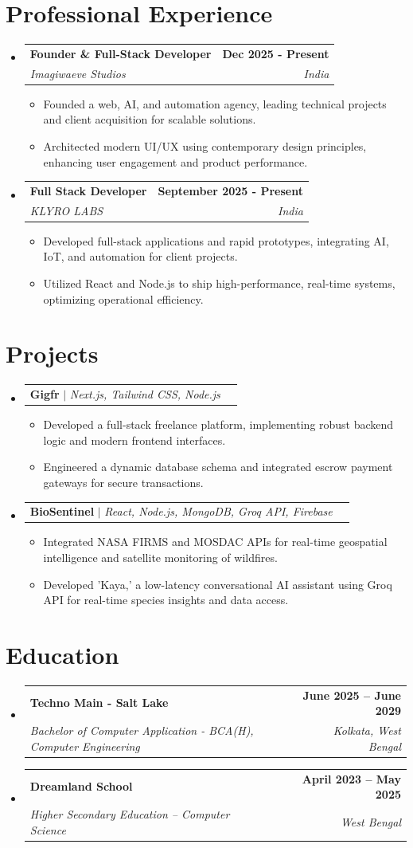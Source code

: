 \documentclass[letterpaper,11pt]{article}
\makeatletter
\newcommand{\resumeItem}[1]{\item\small{{#1 \vspace{-2pt}}}}
\newcommand{\resumeSubheading}[4]{\vspace{-2pt}\item\begin{tabular*}{1.0\textwidth}[t]{l@{\extracolsep{\fill}}r}\textbf{#1} & \textbf{\small #2} \\\textit{\small#3} & \textit{\small #4} \\\end{tabular*}\vspace{-7pt}}
\newcommand{\resumeProjectHeading}[2]{\item\begin{tabular*}{1.001\textwidth}{l@{\extracolsep{\fill}}r}\small#1 & \textbf{\small #2}\\\end{tabular*}\vspace{-7pt}}
\newcommand{\resumeSubHeadingListStart}{\begin{itemize}[leftmargin=0.0in, label={}]}
\newcommand{\resumeSubHeadingListEnd}{\end{itemize}}
\newcommand{\resumeItemListStart}{\begin{itemize}}
\newcommand{\resumeItemListEnd}{\end{itemize}\vspace{-5pt}}
\makeatother
\begin{document}
\section{Professional Experience}
  \resumeSubHeadingListStart
\resumeSubheading{Founder \& Full-Stack Developer}{Dec 2025 - Present}{Imagiwaeve Studios}{India}
\resumeItemListStart
\resumeItem{Founded a web, AI, and automation agency, leading technical projects and client acquisition for scalable solutions.}
\resumeItem{Architected modern UI/UX using contemporary design principles, enhancing user engagement and product performance.}
\resumeItemListEnd
\resumeSubheading{Full Stack Developer}{September 2025 - Present}{KLYRO LABS}{India}
\resumeItemListStart
\resumeItem{Developed full-stack applications and rapid prototypes, integrating AI, IoT, and automation for client projects.}
\resumeItem{Utilized React and Node.js to ship high-performance, real-time systems, optimizing operational efficiency.}
\resumeItemListEnd
  \resumeSubHeadingListEnd
\vspace{-16pt}

\section{Projects}
\resumeSubHeadingListStart
\resumeProjectHeading{\textbf{Gigfr} $|$ \footnotesize\textit{Next.js, Tailwind CSS, Node.js}}{}
\resumeItemListStart
\resumeItem{Developed a full-stack freelance platform, implementing robust backend logic and modern frontend interfaces.}
\resumeItem{Engineered a dynamic database schema and integrated escrow payment gateways for secure transactions.}
\resumeItemListEnd
\resumeProjectHeading{\textbf{BioSentinel} $|$ \footnotesize\textit{React, Node.js, MongoDB, Groq API, Firebase}}{}
\resumeItemListStart
\resumeItem{Integrated NASA FIRMS and MOSDAC APIs for real-time geospatial intelligence and satellite monitoring of wildfires.}
\resumeItem{Developed 'Kaya,' a low-latency conversational AI assistant using Groq API for real-time species insights and data access.}
\resumeItemListEnd
\resumeSubHeadingListEnd

\section{Education}
  \resumeSubHeadingListStart
    \resumeSubheading
      {Techno Main - Salt Lake}{June 2025 -- June 2029}
      {Bachelor of Computer Application - BCA(H), Computer Engineering}{Kolkata, West Bengal}
    \resumeSubheading
      {Dreamland School}{April 2023 -- May 2025}
      {Higher Secondary Education -- Computer Science}{West Bengal}
  \resumeSubHeadingListEnd 
\vspace{-16pt}
\end{document}
